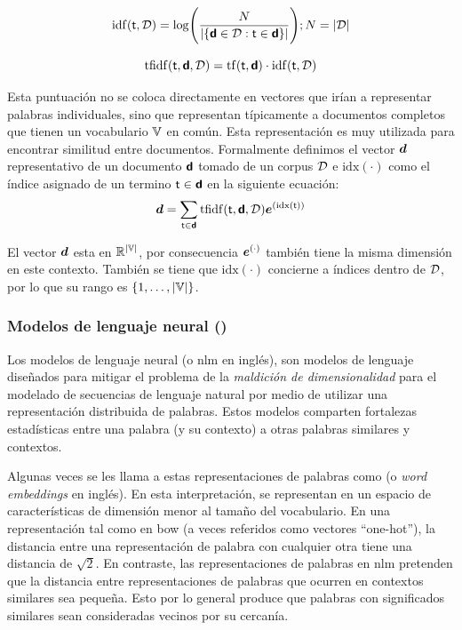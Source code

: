 \begin{equation} \label{eq:idf-repr}
  \mathrm{idf}({\mathit{\mathsf{t}}}, \mathcal{D}) = \mathrm{log}\Bigg( \frac{N}{|\{{\bm{\mathit{\mathsf{d}}}} \in \mathcal{D} : {\mathit{\mathsf{t}}} \in {\bm{\mathit{\mathsf{d}}}}\}|} \Bigg) ; N = |\mathcal{D}|
\end{equation}

\begin{equation} \label{eq:tfidf-repr}
  \mathrm{tfidf}({\mathit{\mathsf{t}}}, {\bm{\mathit{\mathsf{d}}}}, \mathcal{D}) = \mathrm{tf}({\mathit{\mathsf{t}}}, {\bm{\mathit{\mathsf{d}}}}) \cdot \mathrm{idf}({\mathit{\mathsf{t}}}, \mathcal{D})
\end{equation}

Esta puntuación no se coloca directamente en vectores que irían a representar palabras individuales, sino que representan típicamente a documentos completos que tienen un vocabulario ${\mathbb{V}}$ en común. Esta representación es muy utilizada para encontrar similitud entre documentos. Formalmente definimos el vector ${\bm{d}}$ representativo de un documento ${\bm{\mathit{\mathsf{d}}}}$ tomado de un \gls{corpus} $\mathcal{D}$ e $\mathrm{idx}(\cdot)$ como el índice asignado de un termino ${\mathit{\mathsf{t}}}\in{\bm{\mathit{\mathsf{d}}}}$ en la siguiente ecuación:
\begin{equation}
  {\bm{d}} = \sum_{{\mathit{\mathsf{t}}}\in{\bm{\mathit{\mathsf{d}}}}} \mathrm{tfidf}({\mathit{\mathsf{t}}}, {\bm{\mathit{\mathsf{d}}}}, \mathcal{D}) {\bm{e}}^{(\mathrm{idx({\mathit{\mathsf{t}}})})}
\end{equation}

El vector ${\bm{d}}$ esta en $\mathbb{R}^{|{\mathbb{V}}|}$, por consecuencia ${\bm{e}}^{(\cdot)}$ también tiene la misma dimensión en este contexto. También se tiene que $\mathrm{idx}(\cdot)$ concierne a índices dentro de $\mathcal{D}$, por lo que su rango es $\{ 1, \ldots, |{\mathbb{V}}| \}$.

\subsubsection{Modelos de lenguaje neural ()}
Los modelos de lenguaje neural (o \gls{nlm} en inglés), son modelos de lenguaje diseñados para mitigar el problema de la \textit{maldición de dimensionalidad} para el modelado de secuencias de lenguaje natural por medio de utilizar una representación distribuida de palabras. Estos modelos comparten fortalezas estadísticas entre una palabra (y su contexto) a otras palabras similares y contextos.

Algunas veces se les llama a estas representaciones de palabras como  (o \textsl{word embeddings} en inglés). En esta interpretación, se representan en un espacio de características de dimensión menor al tamaño del vocabulario. En una representación tal como en \gls{bow} (a veces referidos como vectores ``one-hot''), la distancia entre una representación de palabra con cualquier otra tiene una distancia de $\sqrt{2}$. En contraste, las representaciones de palabras en \gls{nlm} pretenden que la distancia entre representaciones de palabras que ocurren en contextos similares sea pequeña. Esto por lo general produce que palabras con significados similares sean consideradas vecinos por su cercanía.

